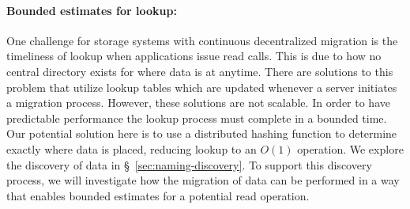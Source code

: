 \paragraph{Bounded estimates for lookup:}
One challenge for storage systems with continuous decentralized migration is
the timeliness of lookup when applications issue read calls. This is due to
how no central directory exists for where data is at anytime. There are
solutions to this problem that utilize lookup tables which are updated
whenever a server initiates a migration process. However, these solutions
are not scalable. In order to have predictable performance the lookup
process must complete in a bounded time. Our potential solution here is to use a
distributed hashing function to determine exactly where data is placed,
reducing lookup to an $O(1)$ operation. We explore the discovery of data in
\S~\ref{sec:naming-discovery}. To support this discovery process, we will
investigate how the migration of data can be performed in a way that enables
bounded estimates  for a potential read operation.






